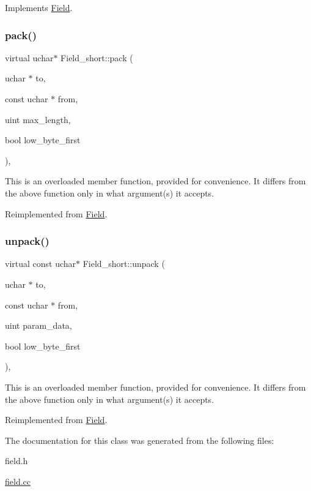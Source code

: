 Implements \mbox{\hyperlink{classField_af3bc27d237b6ae6ef3dc7a2aec3d79ac}{Field}}.

\mbox{\label{classField__short_a53af61e2ddf7e5e25d67e1bd1ea78099}} 
\subsubsection{\texorpdfstring{pack()}{pack()}}
{\footnotesize\ttfamily virtual uchar$\ast$ Field\+\_\+short\+::pack (\begin{DoxyParamCaption}\item[{uchar $\ast$}]{to,  }\item[{const uchar $\ast$}]{from,  }\item[{uint}]{max\+\_\+length,  }\item[{bool}]{low\+\_\+byte\+\_\+first }\end{DoxyParamCaption})\hspace{0.3cm}{\ttfamily [inline]}, {\ttfamily [virtual]}}

This is an overloaded member function, provided for convenience. It differs from the above function only in what argument(s) it accepts.

Reimplemented from \mbox{\hyperlink{classField_a9eaff8d3425ef0e1da69b32cbd8f2879}{Field}}.

\mbox{\label{classField__short_ab017d92c943d172dd8f6691e6657cf7d}} 
\subsubsection{\texorpdfstring{unpack()}{unpack()}}
{\footnotesize\ttfamily virtual const uchar$\ast$ Field\+\_\+short\+::unpack (\begin{DoxyParamCaption}\item[{uchar $\ast$}]{to,  }\item[{const uchar $\ast$}]{from,  }\item[{uint}]{param\+\_\+data,  }\item[{bool}]{low\+\_\+byte\+\_\+first }\end{DoxyParamCaption})\hspace{0.3cm}{\ttfamily [inline]}, {\ttfamily [virtual]}}

This is an overloaded member function, provided for convenience. It differs from the above function only in what argument(s) it accepts.

Reimplemented from \mbox{\hyperlink{classField_a42f448ff2c939d91949f7635d939b16b}{Field}}.



The documentation for this class was generated from the following files\+:\begin{DoxyCompactItemize}
\item 
field.\+h\item 
\mbox{\hyperlink{field_8cc}{field.\+cc}}\end{DoxyCompactItemize}
